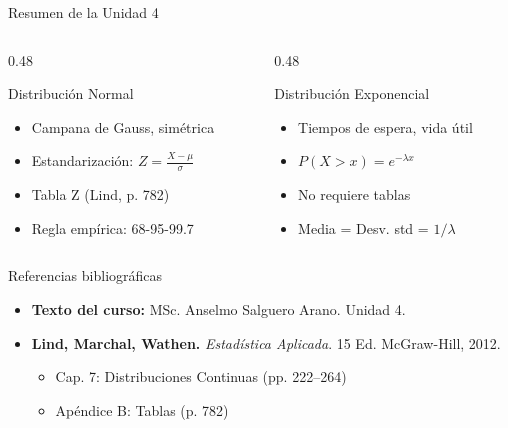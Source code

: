 \documentclass[10pt]{beamer}
\begin{document}
\begin{frame}{Resumen de la Unidad 4}
\begin{columns}[T]
\begin{column}{0.48\textwidth}
\begin{block}{Distribución Normal}
\begin{itemize}
  \item Campana de Gauss, simétrica
  \item Estandarización: $Z = \frac{X-\mu}{\sigma}$
  \item Tabla Z (Lind, p. 782)
  \item Regla empírica: 68-95-99.7
\end{itemize}
\end{block}
\end{column}
\begin{column}{0.48\textwidth}
\begin{exampleblock}{Distribución Exponencial}
\begin{itemize}
  \item Tiempos de espera, vida útil
  \item $P(X > x) = e^{-\lambda x}$
  \item No requiere tablas
  \item Media = Desv. std = $1/\lambda$
\end{itemize}
\end{exampleblock}
\end{column}
\end{columns}

\vspace{0.3cm}
\begin{alertblock}{Referencias bibliográficas}
\begin{itemize}
  \item \textbf{Texto del curso:} MSc. Anselmo Salguero Arano. Unidad 4.
  \item \textbf{Lind, Marchal, Wathen.} \textit{Estadística Aplicada}. 15 Ed. McGraw-Hill, 2012.
  \begin{itemize}
    \item Cap. 7: Distribuciones Continuas (pp. 222--264)
    \item Apéndice B: Tablas (p. 782)
  \end{itemize}
\end{itemize}
\end{alertblock}
\end{frame}
\end{document}
